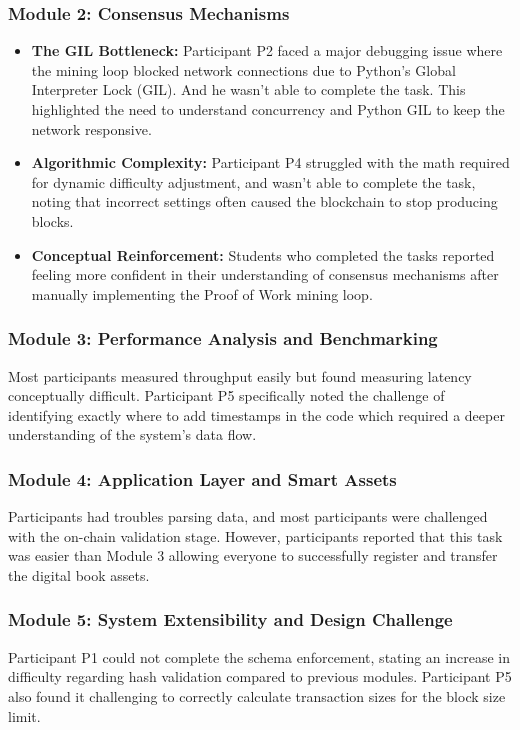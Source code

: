 \subsubsection{Module 2: Consensus Mechanisms}
\begin{itemize}
    \item \textbf{The GIL Bottleneck:} Participant P2 faced a major debugging issue where the mining loop blocked network connections due to Python's Global Interpreter Lock (GIL). And he wasn't able to complete the task. This highlighted the need to understand concurrency and Python GIL to keep the network responsive.
    \item \textbf{Algorithmic Complexity:} Participant P4 struggled with the math required for dynamic difficulty adjustment, and wasn't able to complete the task, noting that incorrect settings often caused the blockchain to stop producing blocks.
    \item \textbf{Conceptual Reinforcement:} Students who completed the tasks reported feeling more confident in their understanding of consensus mechanisms after manually implementing the Proof of Work mining loop.
\end{itemize}

\subsubsection{Module 3: Performance Analysis and Benchmarking}
Most participants measured throughput easily but found measuring latency conceptually difficult. Participant P5 specifically noted the challenge of identifying exactly where to add timestamps in the code which required a deeper understanding of the system's data flow.

\subsubsection{Module 4: Application Layer and Smart Assets}
Participants had troubles parsing data, and most participants were challenged with the on-chain validation stage. However, participants reported that this task was easier than Module 3 allowing everyone to successfully register and transfer the digital book assets.

\subsubsection{Module 5: System Extensibility and Design Challenge}
Participant P1 could not complete the schema enforcement, stating an increase in difficulty regarding hash validation compared to previous modules. Participant P5 also found it challenging to correctly calculate transaction sizes for the block size limit.


